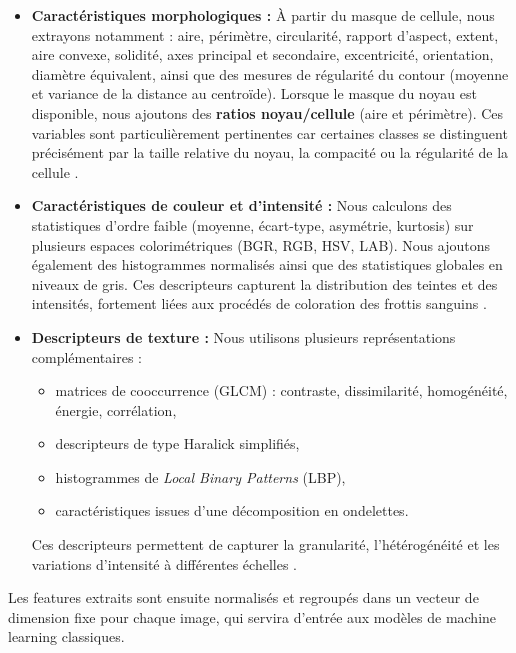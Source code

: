 \documentclass[journal,twocolumn]{IEEEtran}
\begin{document}
\begin{itemize}

\item \textbf{Caractéristiques morphologiques :}
À partir du masque de cellule, nous extrayons notamment : aire, périmètre, circularité, rapport d’aspect, extent, aire convexe, solidité, axes principal et secondaire, excentricité, orientation, diamètre équivalent, ainsi que des mesures de régularité du contour (moyenne et variance de la distance au centroïde). Lorsque le masque du noyau est disponible, nous ajoutons des \textbf{ratios noyau/cellule} (aire et périmètre). Ces variables sont particulièrement pertinentes car certaines classes se distinguent précisément par la taille relative du noyau, la compacité ou la régularité de la cellule \cite{REZATOFIGHI2011333}.

\item \textbf{Caractéristiques de couleur et d’intensité :}
Nous calculons des statistiques d’ordre faible (moyenne, écart-type, asymétrie, kurtosis) sur plusieurs espaces colorimétriques (BGR, RGB, HSV, LAB). Nous ajoutons également des histogrammes normalisés ainsi que des statistiques globales en niveaux de gris. Ces descripteurs capturent la distribution des teintes et des intensités, fortement liées aux procédés de coloration des frottis sanguins \cite{healthcare10112230}.

\item \textbf{Descripteurs de texture :}
Nous utilisons plusieurs représentations complémentaires :
\begin{itemize}
    \item matrices de cooccurrence (GLCM) : contraste, dissimilarité, homogénéité, énergie, corrélation,
    \item descripteurs de type Haralick simplifiés,
    \item histogrammes de \textit{Local Binary Patterns} (LBP),
    \item caractéristiques issues d’une décomposition en ondelettes.
\end{itemize}
Ces descripteurs permettent de capturer la granularité, l’hétérogénéité et les variations d’intensité à différentes échelles \cite{REZATOFIGHI2011333,healthcare10112230}.

\end{itemize}

Les features extraits sont ensuite normalisés et regroupés dans un vecteur de dimension fixe pour chaque image, qui servira d’entrée aux modèles de machine learning classiques.
\end{document}
